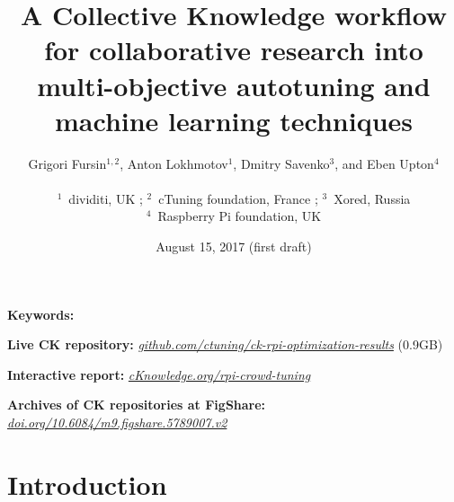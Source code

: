 \documentclass[10pt,letterpaper,twocolumn]{article}
\begin{document}
\date{August 15, 2017 (first draft)}

\title{A Collective Knowledge workflow for collaborative research into\\multi-objective autotuning and machine learning techniques}

\author{Grigori Fursin$^{1,2}$, Anton Lokhmotov$^1$, Dmitry Savenko$^3$, and Eben Upton$^{4}$ \\
\\
$^1$~dividiti, UK ; $^2$~cTuning foundation, France ; $^3$~Xored, Russia \\
$^4$~Raspberry Pi foundation, UK \\
}

\maketitle

\begin{abstract}
 
\end{abstract}

{\bf Keywords:}
{\it\small 
 
}

{\bf Live CK repository:} \newline
\textit{\href{https://github.com/ctuning/ck-rpi-optimization-results}{github.com/ctuning/ck-rpi-optimization-results}} (0.9GB)

{\bf Interactive report:} \newline
\textit{\href{http://cKnowledge.org/rpi-crowd-tuning}{cKnowledge.org/rpi-crowd-tuning}}

{\bf Archives of CK repositories at FigShare:} \newline
\textit{\href{https://doi.org/10.6084/m9.figshare.5789007.v2}{doi.org/10.6084/m9.figshare.5789007.v2}}



\section{Introduction} %
\label{introduction} %

\end{document}

